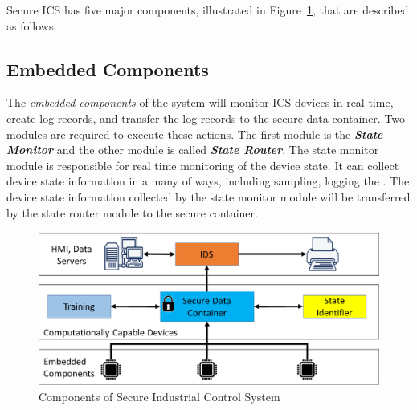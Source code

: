 \documentclass[conference]{IEEEtran}
\begin{document}
Secure ICS has five major components, illustrated in Figure~\ref{sec_ics}, that are described as follows.

\subsection{Embedded Components}
The {\em embedded components} of the system will monitor ICS devices in real time, create log records, and transfer the log records to the secure data container. Two modules are required to execute these actions. The first module is the \textit{\textbf{State Monitor}} and the other module is called \textit{\textbf{State Router}}. The state monitor module is responsible for real time monitoring of the device state. It can collect device state information in a many of ways, including sampling, logging the . The device state information collected by the state monitor module will be transferred by the state router module to the secure container. 

\begin{figure}[htbp]
\centering
\centerline{\includegraphics [width=.5\textwidth]{sec_scada.png}}
\caption{Components of Secure Industrial Control System }
\label{sec_ics}
\end{figure}
\end{document}
